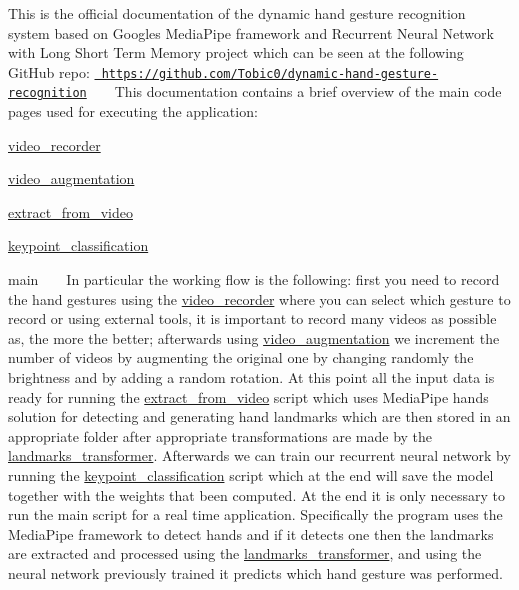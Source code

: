 This is the official documentation of the dynamic hand gesture recognition system based on Google\textquotesingle{}s Media\+Pipe framework and Recurrent Neural Network with Long Short Term Memory project which can be seen at the following Git\+Hub repo\+: \href{https://github.com/Tobic0/dynamic-hand-gesture-recognition}{\texttt{ https\+://github.\+com/\+Tobic0/dynamic-\/hand-\/gesture-\/recognition}} ~\newline
~\newline
 This documentation contains a brief overview of the main code pages used for executing the application\+:
\begin{DoxyItemize}
\item \mbox{\hyperlink{namespacevideo__recorder}{video\+\_\+recorder}}
\item \mbox{\hyperlink{namespacevideo__augmentation}{video\+\_\+augmentation}}
\item \mbox{\hyperlink{namespaceextract__from__video}{extract\+\_\+from\+\_\+video}}
\item \mbox{\hyperlink{namespacekeypoint__classification}{keypoint\+\_\+classification}}
\item main ~\newline
~\newline
 In particular the working flow is the following\+: first you need to record the hand gestures using the \mbox{\hyperlink{namespacevideo__recorder}{video\+\_\+recorder}} where you can select which gesture to record or using external tools, it is important to record many videos as possible as, the more the better; afterwards using \mbox{\hyperlink{namespacevideo__augmentation}{video\+\_\+augmentation}} we increment the number of videos by augmenting the original one by changing randomly the brightness and by adding a random rotation. At this point all the input data is ready for running the \mbox{\hyperlink{namespaceextract__from__video}{extract\+\_\+from\+\_\+video}} script which uses Media\+Pipe hands solution for detecting and generating hand landmarks which are then stored in an appropriate folder after appropriate transformations are made by the \mbox{\hyperlink{namespacelandmarks__transformer}{landmarks\+\_\+transformer}}. Afterwards we can train our recurrent neural network by running the \mbox{\hyperlink{namespacekeypoint__classification}{keypoint\+\_\+classification}} script which at the end will save the model together with the weights that been computed. At the end it is only necessary to run the main script for a real time application. Specifically the program uses the Media\+Pipe framework to detect hands and if it detects one then the landmarks are extracted and processed using the \mbox{\hyperlink{namespacelandmarks__transformer}{landmarks\+\_\+transformer}}, and using the neural network previously trained it predicts which hand gesture was performed. 
\end{DoxyItemize}